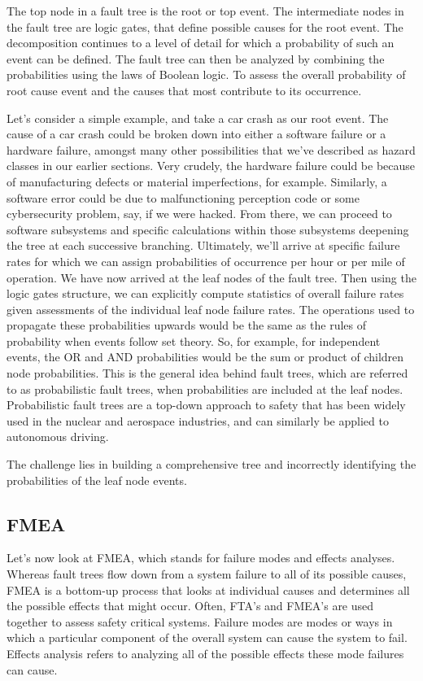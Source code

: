 The top node in a fault tree is the root or top event. 
The intermediate nodes in the fault tree are logic gates, 
that define possible causes for the root event. 
The decomposition continues to a level of detail for which a probability of such an event can be defined. 
The fault tree can then be analyzed by combining the probabilities using the laws of Boolean logic. 
To assess the overall probability of root cause event and the causes that most contribute to its occurrence. 

Let's consider a simple example, and take a car crash as our root event. 
The cause of a car crash could be broken down into either a software failure or a 
hardware failure, amongst many other possibilities that we've described as hazard classes in our earlier sections. 
Very crudely, the hardware failure could be because of manufacturing defects or material imperfections, for example. 
Similarly, a software error could be due to malfunctioning perception code or some cybersecurity problem, say, if we were hacked. 
From there, we can proceed to software subsystems and specific calculations within those subsystems deepening the tree at each successive branching. 
Ultimately, we'll arrive at specific failure rates for which we can assign probabilities of occurrence per hour or per mile of operation. 
We have now arrived at the leaf nodes of the fault tree. 
Then using the logic gates structure, we can explicitly compute statistics of overall failure rates given assessments of the individual leaf node failure rates. 
The operations used to propagate these probabilities upwards would be the same as the rules of probability when events 
follow set theory. So, for example, for independent events, the OR and AND probabilities would be the sum or product of children node probabilities. 
This is the general idea behind fault trees, which are referred to as probabilistic fault trees, 
when probabilities are included at the leaf nodes. Probabilistic fault trees are a top-down approach to safety that has 
been widely used in the nuclear and aerospace industries, and can similarly be applied to autonomous driving. 

The challenge lies in building a comprehensive tree and incorrectly identifying the probabilities of the leaf node events. 

\subsection{FMEA}
Let's now look at FMEA, which stands for failure modes and effects analyses. 
Whereas fault trees flow down from a system failure to all of its possible causes, 
FMEA is a bottom-up process that looks at individual causes and determines all the possible effects that might occur. 
Often, FTA's and FMEA's are used together to assess safety critical systems. 
Failure modes are modes or ways in which a particular component of the overall system can cause the system to fail. 
Effects analysis refers to analyzing all of the possible effects these mode failures can cause. 

